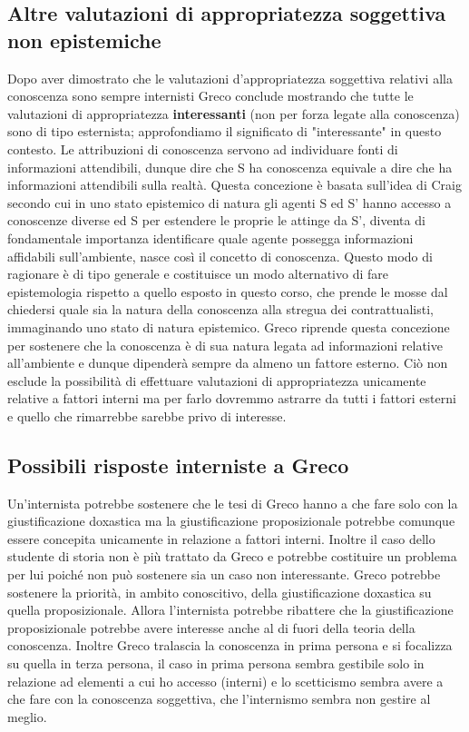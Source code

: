 \documentclass[10pt,a4paper]{article}
\begin{document}
\subsection{Altre valutazioni di appropriatezza soggettiva non epistemiche}
Dopo aver dimostrato che le valutazioni d'appropriatezza soggettiva relativi alla conoscenza sono sempre internisti Greco conclude mostrando che tutte le valutazioni di appropriatezza \textbf{interessanti} (non per forza legate alla conoscenza) sono di tipo esternista; approfondiamo il significato di "interessante" in questo contesto. Le attribuzioni di conoscenza servono ad individuare fonti di informazioni attendibili, dunque dire che S ha conoscenza equivale a dire che ha informazioni attendibili sulla realtà. Questa concezione è basata sull'idea di Craig secondo cui in uno stato epistemico di natura gli agenti S ed S' hanno accesso a conoscenze diverse ed S per estendere le proprie le attinge da S', diventa di fondamentale importanza identificare quale agente possegga informazioni affidabili sull'ambiente, nasce così il concetto di conoscenza. Questo modo di ragionare è di tipo generale e costituisce un modo alternativo di fare epistemologia rispetto a quello esposto in questo corso, che prende le mosse dal chiedersi quale sia la natura della conoscenza alla stregua dei contrattualisti, immaginando uno stato di natura epistemico. Greco riprende questa concezione per sostenere che la conoscenza è di sua natura legata ad informazioni relative all'ambiente e dunque dipenderà sempre da almeno un fattore esterno. Ciò non esclude la possibilità di effettuare valutazioni di appropriatezza unicamente relative a fattori interni ma per farlo dovremmo astrarre da tutti i fattori esterni e quello che rimarrebbe sarebbe privo di interesse.
\subsection{Possibili risposte interniste a Greco}
Un'internista potrebbe sostenere che le tesi di Greco hanno a che fare solo con la giustificazione doxastica ma la giustificazione proposizionale potrebbe comunque essere concepita unicamente in relazione a fattori interni. Inoltre il caso dello studente di storia non è più trattato da Greco e potrebbe costituire un problema per lui poiché non può sostenere sia un caso non interessante. Greco potrebbe sostenere la priorità, in ambito conoscitivo, della giustificazione doxastica su quella proposizionale. Allora l'internista potrebbe ribattere che la giustificazione proposizionale potrebbe avere interesse anche al di fuori della teoria della conoscenza. Inoltre Greco tralascia la conoscenza in prima persona e si focalizza su quella in terza persona, il caso in prima persona sembra gestibile solo in relazione ad elementi a cui ho accesso (interni) e lo scetticismo sembra avere a che fare con la conoscenza soggettiva, che l'internismo sembra non gestire al meglio. 
\end{document}
